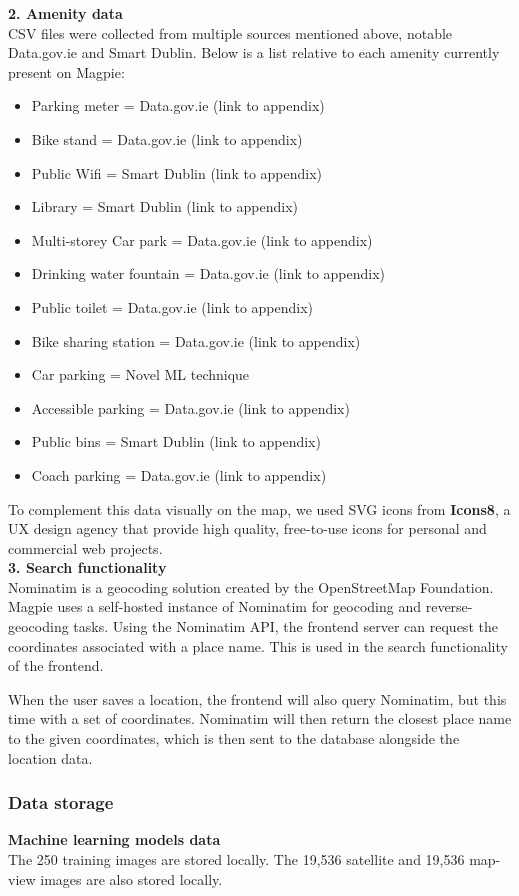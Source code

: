 \textbf{2. Amenity data}\\
CSV files were collected from multiple sources mentioned above, notable Data.gov.ie and Smart Dublin. Below is a list relative to each amenity currently present on Magpie:
\begin{itemize}
    \item Parking meter = Data.gov.ie (link to appendix)
    \item Bike stand = Data.gov.ie (link to appendix)
    \item Public Wifi = Smart Dublin (link to appendix)
    \item Library = Smart Dublin (link to appendix)
    \item Multi-storey Car park = Data.gov.ie (link to appendix)
    \item Drinking water fountain = Data.gov.ie (link to appendix)
    \item Public toilet = Data.gov.ie (link to appendix)
    \item Bike sharing station = Data.gov.ie (link to appendix)
    \item Car parking = Novel ML technique
    \item Accessible parking = Data.gov.ie (link to appendix)
    \item Public bins = Smart Dublin (link to appendix)
    \item Coach parking = Data.gov.ie (link to appendix)
\end{itemize}
To complement this data visually on the map, we used SVG icons from \textbf{Icons8}, a UX design agency that provide high quality, free-to-use icons for personal and commercial web projects.\\

\textbf{3. Search functionality}\\
Nominatim is a geocoding solution created by the OpenStreetMap Foundation. Magpie uses a self-hosted instance of Nominatim for geocoding and reverse-geocoding tasks. Using the Nominatim API, the frontend server can request the coordinates associated with a place name. This is used in the search functionality of the frontend.

When the user saves a location, the frontend will also query Nominatim, but this
time with a set of coordinates. Nominatim will then return the closest place
name to the given coordinates, which is then sent to the database alongside the
location data.

\subsubsection{Data storage}
\textbf{Machine learning models data}\\
The 250 training images are stored locally.
The 19,536 satellite and 19,536 map-view images are also stored locally.

